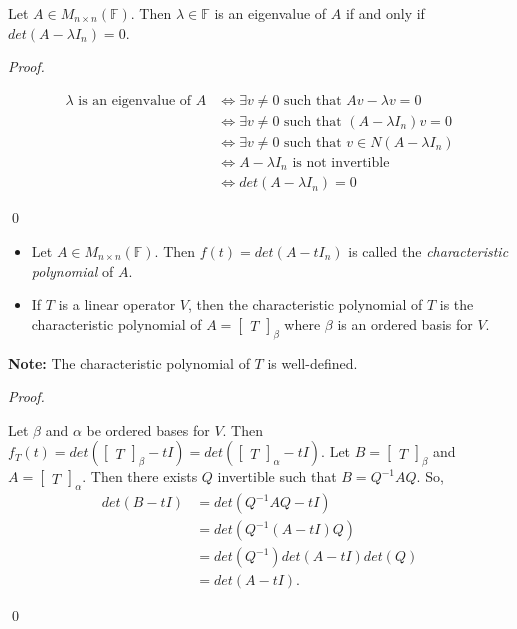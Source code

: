 \documentclass[12pt]{article}
\newenvironment{theorem}[2][Theorem]{\begin{trivlist}
\item[\hskip \labelsep {\bfseries #1}\hskip \labelsep {\bfseries #2.}]}{\end{trivlist}}
\newenvironment{definition}[2][Definition]{\begin{trivlist}
\item[\hskip \labelsep {\bfseries #1}\hskip \labelsep {\bfseries #2}]}{\end{trivlist}}
\newenvironment{sol}
    {\emph{Proof.}
    }
    {
    \qed
    }
\begin{document}
\begin{theorem}{5.2}
Let $A \in M_{n \times n}(\mathbb{F})$. Then $\lambda \in \mathbb{F}$ is an eigenvalue of $A$ if and only if $det(A - \lambda I_n) = 0$.
\end{theorem}

\begin{sol}
\begin{align*}
    \lambda \text{ is an eigenvalue of $A$} &\Longleftrightarrow \exists v \neq 0 \text{ such that }
Av - \lambda v = 0 \\ 
&\Longleftrightarrow \exists v \neq 0 \text{ such that }
(A - \lambda I_n)v = 0 \\
&\Longleftrightarrow \exists v \neq 0 \text{ such that }
v \in N(A - \lambda I_n) \\
&\Longleftrightarrow A - \lambda I_n \text{ is not invertible} \\
&\Longleftrightarrow det(A - \lambda I_n) = 0
\end{align*}
\end{sol}

\begin{definition}{3} \text{ }
\begin{itemize}
    \item Let $A \in M_{n \times n}(\mathbb{F})$. Then $f(t) = det(A - t I_n)$ is called the \textit{characteristic polynomial} of $A$.
    
    \item If $T$ is a linear operator $V$, then the characteristic polynomial of $T$ is the characteristic polynomial of $A = \begin{bmatrix} T \end{bmatrix}_\beta$ where $\beta$ is an ordered basis for $V$.
\end{itemize}
\end{definition}

\noindent\textbf{Note:} The characteristic polynomial of $T$ is well-defined.

\begin{sol}
Let $\beta$ and $\alpha$ be ordered bases for $V$. Then $f_T(t) = det(\begin{bmatrix}
T
\end{bmatrix}_\beta - tI) = det(\begin{bmatrix}
T
\end{bmatrix}_\alpha - tI)$. Let $B = \begin{bmatrix}
T
\end{bmatrix}_\beta$ and $A = \begin{bmatrix}
T
\end{bmatrix}_\alpha$. Then there exists $Q$ invertible such that $B = Q^{-1}AQ$. So, \begin{align*}
    det(B - tI) &= det(Q^{-1}AQ - tI) \\
    &= det(Q^{-1}(A - tI)Q) \\
    &= det(Q^{-1})det(A-tI)det(Q) \\
    &= det(A-tI).
\end{align*}
\end{sol}
\end{document}

